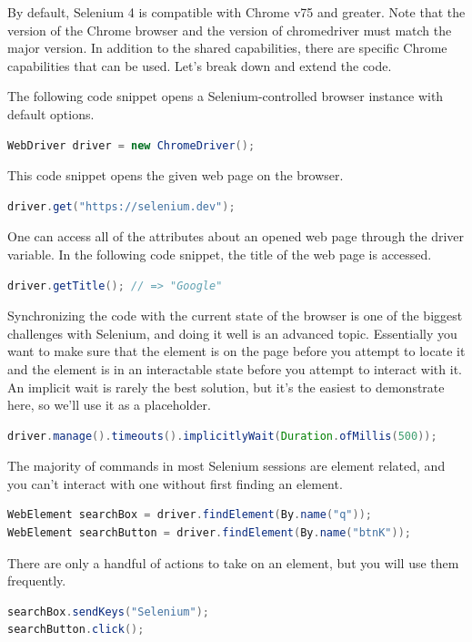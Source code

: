 By default, Selenium 4 is compatible with Chrome v75 and greater. Note that the version of the Chrome browser and the version of chromedriver must match the major version. In addition to the shared capabilities, there are specific Chrome capabilities that can be used. Let's break down and extend the code.

The following code snippet opens a Selenium-controlled browser instance with default options.
\begin{lstlisting}[language=java]
WebDriver driver = new ChromeDriver();
\end{lstlisting}

This code snippet opens the given web page on the browser.
\begin{lstlisting}[language=java]
driver.get("https://selenium.dev");
\end{lstlisting}

One can access all of the attributes about an opened web page through the driver variable. In the following code snippet, the title of the web page is accessed.
\begin{lstlisting}[language=java]
driver.getTitle(); // => "Google"
\end{lstlisting}

Synchronizing the code with the current state of the browser is one of the biggest challenges with Selenium, and doing it well is an advanced topic. Essentially you want to make sure that the element is on the page before you attempt to locate it and the element is in an interactable state before you attempt to interact with it. An implicit wait is rarely the best solution, but it’s the easiest to demonstrate here, so we’ll use it as a placeholder.
\begin{lstlisting}[language=java]
driver.manage().timeouts().implicitlyWait(Duration.ofMillis(500));
\end{lstlisting}

The majority of commands in most Selenium sessions are element related, and you can’t interact with one without first finding an element.
\begin{lstlisting}[language=java]
WebElement searchBox = driver.findElement(By.name("q"));
WebElement searchButton = driver.findElement(By.name("btnK"));
\end{lstlisting}

There are only a handful of actions to take on an element, but you will use them frequently.
\begin{lstlisting}[language=java]
searchBox.sendKeys("Selenium");
searchButton.click();
\end{lstlisting}


